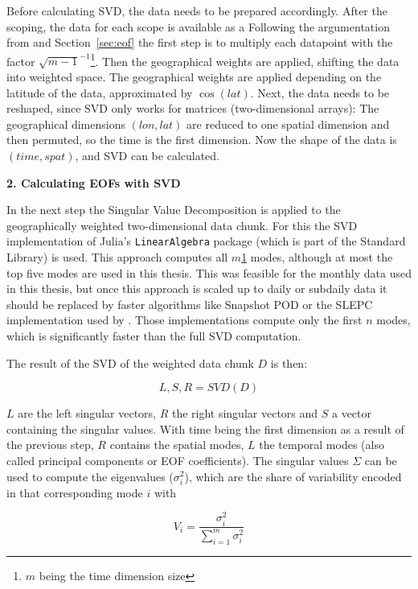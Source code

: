 Before calculating SVD, the data needs to be prepared accordingly. 
After the scoping, the data for each scope is available as a 
Following the argumentation from \cite{vietinghoffdiss} and Section~\ref{sec:eof} the first step is to multiply each datapoint with the factor $\sqrt{m-1}^{-1}$\footnote{\label{timesize}$m$ being the time dimension size}. 
Then the geographical weights are applied, shifting the data into weighted space. 
The geographical weights are applied depending on the latitude of the data, approximated by $\cos(lat)$. 
Next, the data needs to be reshaped, since SVD only works for matrices (two-dimensional arrays): The geographical dimensions $(lon, lat)$ are reduced to one spatial dimension and then permuted, so the time is the first dimension. 
Now the shape of the data is $(time, spat)$, and SVD can be calculated. 

\textbf{2. Calculating EOFs with SVD}

In the next step the Singular Value Decomposition is applied to the geographically weighted two-dimensional data chunk. 
For this the SVD implementation of Julia's \texttt{Linear\-Algebra} package (which is part of the Standard Library) is used.
This approach computes all $m$\cref{timesize} modes, although at most the top five modes are used in this thesis. 
This was feasible for the monthly data used in this thesis, but once this approach is scaled up to daily or subdaily data it should be replaced by faster algorithms like Snapshot POD or the SLEPC implementation used by \citeauthor{vietinghoffdiss} \cite{vietinghoffdiss}.
Those implementations compute only the first $n$ modes, which is significantly faster than the full SVD computation. 

The result of the SVD of the weighted data chunk $D$ is then:

\begin{equation}
\label{eq:SVD}
L,S,R = SVD(D)
\end{equation}

$L$ are the left singular vectors, $R$ the right singular vectors and $S$ a vector containing the singular values. 
With time being the first dimension as a result of the previous step, $R$ contains the spatial modes, $L$ the temporal modes (also called principal components or EOF coefficients). 
The singular values $\Sigma$ can be used to compute the eigenvalues ($\sigma_i^2$), which are  the share of variability encoded in that corresponding mode $i$ with 

\begin{equation}
\label{eq:singularval variability}
V_i = \frac{\sigma_i^2}{\sum_{i=1}^{m}\sigma_i^2}
\end{equation}


